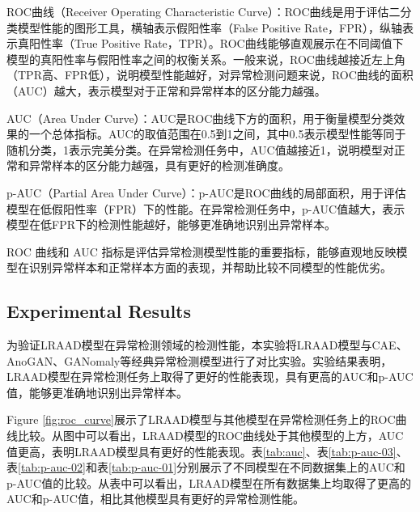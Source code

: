 \documentclass{article}
\begin{document}
ROC曲线（Receiver Operating Characteristic Curve）：ROC曲线是用于评估二分类模型性能的图形工具，横轴表示假阳性率（False Positive Rate，FPR），纵轴表示真阳性率（True Positive Rate，TPR）。ROC曲线能够直观展示在不同阈值下模型的真阳性率与假阳性率之间的权衡关系。一般来说，ROC曲线越接近左上角（TPR高、FPR低），说明模型性能越好，对异常检测问题来说，ROC曲线的面积（AUC）越大，表示模型对于正常和异常样本的区分能力越强。

AUC（Area Under Curve）：AUC是ROC曲线下方的面积，用于衡量模型分类效果的一个总体指标。AUC的取值范围在0.5到1之间，其中0.5表示模型性能等同于随机分类，1表示完美分类。在异常检测任务中，AUC值越接近1，说明模型对正常和异常样本的区分能力越强，具有更好的检测准确度。

p-AUC（Partial Area Under Curve）：p-AUC是ROC曲线的局部面积，用于评估模型在低假阳性率（FPR）下的性能。在异常检测任务中，p-AUC值越大，表示模型在低FPR下的检测性能越好，能够更准确地识别出异常样本。

ROC 曲线和 AUC 指标是评估异常检测模型性能的重要指标，能够直观地反映模型在识别异常样本和正常样本方面的表现，并帮助比较不同模型的性能优劣。

\subsection{Experimental Results}
为验证LRAAD模型在异常检测领域的检测性能，本实验将LRAAD模型与CAE、AnoGAN、GANomaly等经典异常检测模型进行了对比实验。实验结果表明，LRAAD模型在异常检测任务上取得了更好的性能表现，具有更高的AUC和p-AUC值，能够更准确地识别出异常样本。

Figure \ref{fig:roc_curve}展示了LRAAD模型与其他模型在异常检测任务上的ROC曲线比较。从图中可以看出，LRAAD模型的ROC曲线处于其他模型的上方，AUC值更高，表明LRAAD模型具有更好的性能表现。表\ref{tab:auc}、表\ref{tab:p-auc-03}、表\ref{tab:p-auc-02}和表\ref{tab:p-auc-01}分别展示了不同模型在不同数据集上的AUC和p-AUC值的比较。从表中可以看出，LRAAD模型在所有数据集上均取得了更高的AUC和p-AUC值，相比其他模型具有更好的异常检测性能。
\end{document}
